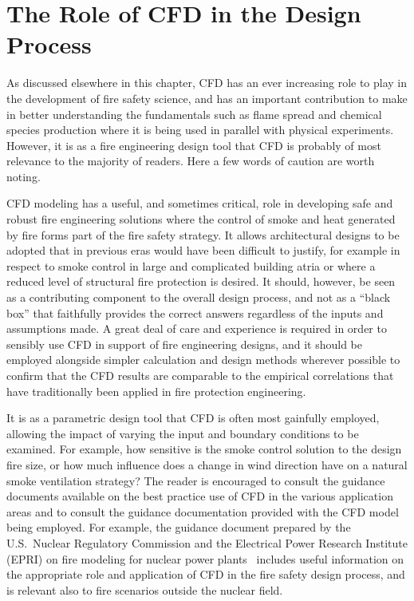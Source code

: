 \documentclass[graybox]{svmult}
\begin{document}
\section{The Role of CFD in the Design Process}

As discussed elsewhere in this chapter, CFD has an ever increasing role to play in the development of fire safety science, and has an important contribution to make in better understanding the fundamentals such as flame spread and chemical species production where it is being used in parallel with physical experiments. However, it is as a fire engineering design tool that CFD is probably of most relevance to the majority of readers. Here a few words of caution are worth noting.

CFD modeling has a useful, and sometimes critical, role in developing safe and robust fire engineering solutions where the control of smoke and heat generated by fire forms part of the fire safety strategy. It allows architectural designs to be adopted that in previous eras would have been difficult to justify, for example in respect to smoke control in large and complicated building atria or where a reduced level of structural fire protection is desired. It should, however, be seen as a contributing component to the overall design process, and not as a ``black box'' that faithfully provides the correct answers regardless of the inputs and assumptions made. A great deal of care and experience is required in order to sensibly use CFD in support of fire engineering designs, and it should be employed alongside simpler calculation and design methods wherever possible to confirm that the CFD results are comparable to the empirical correlations that have traditionally been applied in fire protection engineering.

It is as a parametric design tool that CFD is often most gainfully employed, allowing the impact of varying the input and boundary conditions to be examined. For example, how sensitive is the smoke control solution to the design fire size, or how much influence does a change in wind direction have on a natural smoke ventilation strategy? The reader is encouraged to consult the guidance documents available on the best practice use of CFD in the various application areas and to consult the guidance documentation provided with the CFD model being employed. For example, the guidance document prepared by the U.S.~Nuclear Regulatory Commission and the Electrical Power Research Institute (EPRI) on fire modeling for nuclear power plants~\cite{Stroup:2012} includes useful information on the appropriate role and application of CFD in the fire safety design process, and is relevant also to fire scenarios outside the nuclear field.
\end{document}
